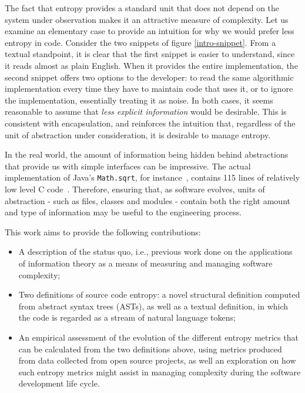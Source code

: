 \documentclass[10pt,conference]{IEEEtran}
\begin{document}
The fact that entropy provides a standard unit that does not depend on the system under observation makes it an attractive measure of complexity. Let us examine an elementary case to provide an intuition for why we would prefer less entropy in code. Consider the two snippets of figure \ref{intro-snippet}. From a textual standpoint, it is clear that the first snippet is easier to understand, since it reads almost as plain English. When it provides the entire implementation, the second snippet offers two options to the developer: to read the same algorithmic implementation every time they have to maintain code that uses it, or to ignore the implementation, essentially treating it as noise. In both cases, it seems reasonable to assume that \textit{less explicit information} would be desirable. This is consistent with encapsulation, and reinforces the intuition that, regardless of the unit of abstraction under consideration, it is desirable to manage entropy.

In the real world, the amount of information being hidden behind abstractions that provide us with simple interfaces can be impressive. The actual implementation of Java's \texttt{Math.sqrt}, for instance~\cite{javaSqrtDoc}, contains 115 lines of relatively low level C code~\cite{soJavaSqrt}. Therefore, ensuring that, as software evolves, units of abstraction  - such as files, classes and modules - contain both the right amount and type of information may be useful to the engineering process.

This work aims to provide the following contributions:
\begin{itemize}
    \item A description of the status quo, i.e., previous work done on the applications of information theory as a means of measuring and managing software complexity;
    \item Two definitions of source code entropy: a novel structural definition computed from abstract syntax trees (ASTs), as well as a textual definition, in which the code is regarded as a stream of natural language tokens;
    \item An empirical assessment of the evolution of the different entropy metrics that can be calculated from the two definitions above, using metrics produced from data collected from open source projects, as well an exploration on how such entropy metrics might assist in managing complexity during the software development life cycle.
\end{itemize}
\end{document}

